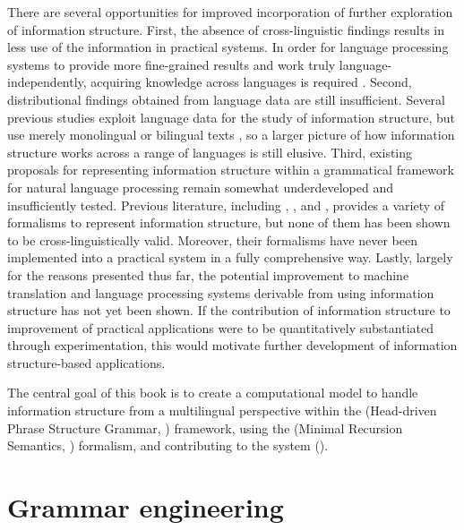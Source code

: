 There are several opportunities for improved incorporation of further
exploration of information structure.  First, the absence of
cross-linguistic findings results in less use of the information in
practical systems.  In order for language processing systems to
provide more fine-grained results and work truly
language-independently, acquiring knowledge across languages is
required \citep{bender:11}.  Second, distributional findings obtained
from language data are still insufficient. Several previous studies
exploit language data for the study of information structure, but use
merely monolingual or bilingual texts
\citep{komagata:99,johansson:01,bouma:etal:10,hasegawa:koenig:11}, so
a larger picture of how information structure works across a range of
languages is still elusive.  Third, existing proposals for
representing information structure within a grammatical framework for
natural language processing remain somewhat underdeveloped and
insufficiently tested.  Previous literature, including
\citet{king:97}, \citet{steedman:00}, and \citet{bildhauer:07},
provides a variety of formalisms to represent information structure,
but none of them has been shown to be cross-linguistically
valid. Moreover, their formalisms have never been implemented into a
practical system in a fully comprehensive way.  Lastly, largely for
the reasons presented thus far, the potential improvement to machine
translation and language processing systems derivable from using
information structure has not yet been shown. If the contribution of
information structure to improvement of practical applications were to
be quantitatively substantiated through experimentation, this would
motivate further development of information structure-based
applications.


The central goal of this book is to create a computational model to
handle information structure from a multilingual perspective within
the  (Head-driven Phrase Structure Grammar,
\citealt{pollard:sag:94}) framework, using the  (Minimal
Recursion Semantics, \citealt{copestake:etal:05}) formalism, and
contributing to the \lingo {} system
(\citealt{bender:etal:10}).



\section{Grammar engineering}
\label{2:sec:grammar-engineering}




